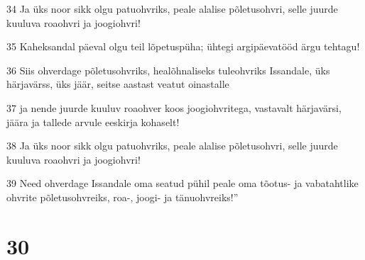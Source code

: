 \par 34 Ja üks noor sikk olgu patuohvriks, peale alalise põletusohvri, selle juurde kuuluva roaohvri ja joogiohvri!
\par 35 Kaheksandal päeval olgu teil lõpetuspüha; ühtegi argipäevatööd ärgu tehtagu!
\par 36 Siis ohverdage põletusohvriks, healõhnaliseks tuleohvriks Issandale, üks härjavärss, üks jäär, seitse aastast veatut oinastalle
\par 37 ja nende juurde kuuluv roaohver koos joogiohvritega, vastavalt härjavärsi, jäära ja tallede arvule eeskirja kohaselt!
\par 38 Ja üks noor sikk olgu patuohvriks, peale alalise põletusohvri, selle juurde kuuluva roaohvri ja joogiohvri!
\par 39 Need ohverdage Issandale oma seatud pühil peale oma tõotus- ja vabatahtlike ohvrite põletusohvreiks, roa-, joogi- ja tänuohvreiks!”

\chapter{30}

